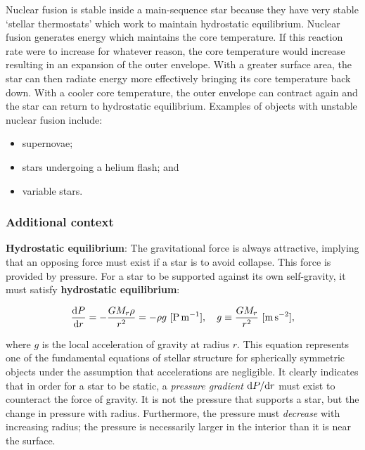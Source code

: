 \documentclass[a4paper,10pt]{article}
\begin{document}
Nuclear fusion is stable inside a main-sequence star because they have very stable `stellar thermostats' which work to maintain hydrostatic equilibrium. Nuclear fusion generates energy which maintains the core temperature. If this reaction rate were to increase for whatever reason, the core temperature would increase resulting in an expansion of the outer envelope. With a greater surface area, the star can then radiate energy more effectively bringing its core temperature back down. With a cooler core temperature, the outer envelope can contract again and the star can return to hydrostatic equilibrium. Examples of objects with unstable nuclear fusion include:

\begin{itemize}
    \item supernovae;
    \item stars undergoing a helium flash; and
    \item variable stars.
\end{itemize}

\subsubsection{Additional context}

{\noindent}\textbf{Hydrostatic equilibrium}: The gravitational force is always attractive, implying that an opposing force must exist if a star is to avoid collapse. This force is provided by pressure. For a star to be supported against its own self-gravity, it must satisfy \textbf{hydrostatic equilibrium}:

\begin{align*}
    \frac{{\rm d}P}{{\rm d}r} = -\frac{GM_r\rho}{r^2} = -\rho g ~ [{\rm P\,m^{-1}}], ~~~ g \equiv \frac{GM_r}{r^2} ~ [{\rm m\,s^{-2}}],
\end{align*}

{\noindent}where $g$ is the local acceleration of gravity at radius $r$. This equation represents one of the fundamental equations of stellar structure for spherically symmetric objects under the assumption that accelerations are negligible. It clearly indicates that in order for a star to be static, a \textit{pressure gradient} ${\rm d}P/{\rm d}r$ must exist to counteract the force of gravity. It is not the pressure that supports a star, but the change in pressure with radius. Furthermore, the pressure must \textit{decrease} with increasing radius; the pressure is necessarily larger in the interior than it is near the surface.
\end{document}
